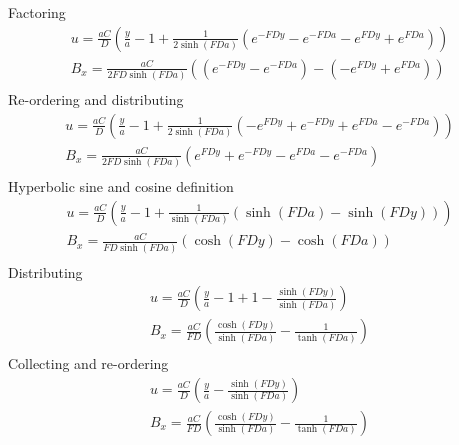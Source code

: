 \documentclass[11pt]{article}
\begin{document}
Factoring
\begin{equation}\begin{aligned}
u   = \frac{aC}{D}  \left( \frac{y}{a} - 1 + \frac{1}{2\sinh(FD a)} \left(   e^{-FD y} - e^{-FD a} - e^{ FD y} + e^{ FD a}\right) \right) \\
B_x = \frac{aC}{2FD\sinh(FD a)} \left(\left(e^{-FD y} - e^{-FD a} \right) - \left( - e^{ FD y} + e^{ FD a} \right) \right) \\
\end{aligned} \end{equation}
Re-ordering and distributing
\begin{equation}\begin{aligned}
u   = \frac{aC}{D}  \left( \frac{y}{a} - 1 + \frac{1}{2\sinh(FD a)} \left( - e^{ FD y} + e^{-FD y} + e^{ FD a} - e^{-FD a} \right) \right) \\
B_x = \frac{aC}{2FD\sinh(FD a)} \left( e^{ FD y} + e^{-FD y}- e^{ FD a} - e^{-FD a} \right) \\
\end{aligned} \end{equation}
Hyperbolic sine and cosine definition
\begin{equation}\begin{aligned}
u   = \frac{aC}{D}  \left( \frac{y}{a} - 1 + \frac{1}{\sinh(FD a)} ( \sinh(FD a) - \sinh(FD y) ) \right) \\
B_x = \frac{aC}{FD\sinh(FD a)} \left( \cosh(FD y) - \cosh(FD a) \right) \\
\end{aligned} \end{equation}
Distributing
\begin{equation}\begin{aligned}
u   = \frac{aC}{D}  \left( \frac{y}{a} - 1 + 1 - \frac{\sinh(FD y)}{\sinh(FD a)} \right) \\
B_x = \frac{aC}{FD} \left( \frac{\cosh(FD y)}{\sinh(FD a)} - \frac{1}{\tanh(FD a)} \right) \\
\end{aligned} \end{equation}
Collecting and re-ordering
\begin{equation}\begin{aligned}
u   = \frac{aC}{D}  \left( \frac{y}{a} - \frac{\sinh(FD y)}{\sinh(FD a)} \right) \\
B_x = \frac{aC}{FD} \left( \frac{\cosh(FD y)}{\sinh(FD a)} - \frac{1}{\tanh(FD a)} \right) \\
\end{aligned} \end{equation}
\end{document}
